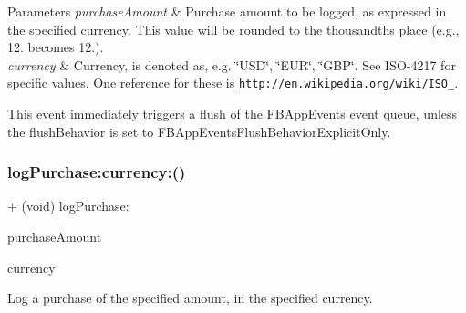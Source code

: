 \begin{DoxyParams}{Parameters}
{\em purchase\+Amount} & Purchase amount to be logged, as expressed in the specified currency. This value will be rounded to the thousandths place (e.\+g., 12. becomes 12.).\\
\hline
{\em currency} & Currency, is denoted as, e.\+g. \char`\"{}\+U\+S\+D\char`\"{}, \char`\"{}\+E\+U\+R\char`\"{}, \char`\"{}\+G\+B\+P\char`\"{}. See I\+S\+O-\/4217 for specific values. One reference for these is \href{http://en.wikipedia.org/wiki/ISO_4217}{\tt http\+://en.\+wikipedia.\+org/wiki/\+I\+S\+O\+\_}.\\
\hline
\end{DoxyParams}
This event immediately triggers a flush of the {\ttfamily \hyperlink{interfaceFBAppEvents}{F\+B\+App\+Events}} event queue, unless the {\ttfamily flush\+Behavior} is set to {\ttfamily F\+B\+App\+Events\+Flush\+Behavior\+Explicit\+Only}. \mbox{\label{interfaceFBAppEvents_a871b481d919104f7dbb67247b682e0fa}} 
\subsubsection{\texorpdfstring{log\+Purchase\+:currency\+:()}{logPurchase:currency:()}\hspace{0.1cm}{\footnotesize\ttfamily [5/5]}}
{\footnotesize\ttfamily + (void) log\+Purchase\+: \begin{DoxyParamCaption}\item[{(double)}]{purchase\+Amount }\item[{currency:(N\+S\+String $\ast$)}]{currency }\end{DoxyParamCaption}}

Log a purchase of the specified amount, in the specified currency.


